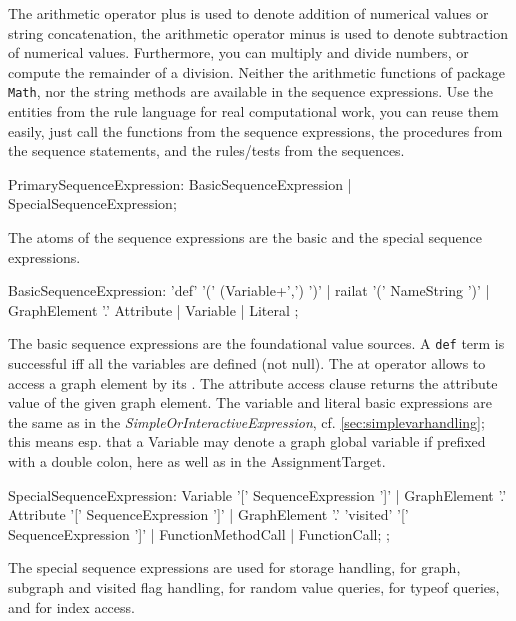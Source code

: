 The arithmetic operator plus is used to denote addition of numerical values or string concatenation,
the arithmetic operator minus is used to denote subtraction of numerical values.
Furthermore, you can multiply and divide numbers, or compute the remainder of a division.
Neither the arithmetic functions of package \texttt{Math}, nor the string methods are available in the sequence expressions.
Use the entities from the rule language for real computational work, you can reuse them easily, just call the functions from the sequence expressions, the procedures from the sequence statements, and the rules/tests from the sequences.

\begin{rail}
  PrimarySequenceExpression:
    BasicSequenceExpression |
    SpecialSequenceExpression;
\end{rail}

The atoms of the sequence expressions are the basic and the special sequence expressions.

\begin{rail}
  BasicSequenceExpression:
    'def' '(' (Variable+',') ')' |
	  railat '(' NameString ')' |
 	  GraphElement '.' Attribute |
	  Variable | 
    Literal
  ;
\end{rail}

The basic sequence expressions are the foundational value sources.
A \texttt{def} term is successful iff all the variables are defined (not null).
The at operator allows to access a graph element by its .
The attribute access clause returns the attribute value of the given graph element.
The variable and literal basic expressions are the same as in the \emph{SimpleOrInteractiveExpression}, cf. \ref{sec:simplevarhandling};
this means esp. that a Variable may denote a graph global variable if prefixed with a double colon, here as well as in the AssignmentTarget.

\begin{rail}
  SpecialSequenceExpression:
    Variable '[' SequenceExpression ']' |
    GraphElement '.' Attribute '[' SequenceExpression ']' |
    GraphElement '.' 'visited' '[' SequenceExpression ']' |
    FunctionMethodCall |
    FunctionCall;
  ;
\end{rail}

The special sequence expressions are used for storage handling, for graph, subgraph and visited flag handling, for random value queries, for typeof queries, and for index access.

